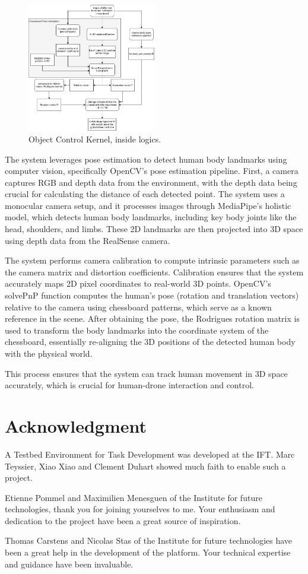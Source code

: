 \begin{figure}[htbp]
    \centerline{\includegraphics[width=0.5\textwidth]{images/objectcomplete.png}}
    \caption{Object Control Kernel, inside logics.}
    \label{fig}
    \end{figure} 
    The system leverages pose estimation to detect human body landmarks using computer vision, specifically OpenCV's pose estimation pipeline. First, a camera captures RGB and depth data from the environment, with the depth data being crucial for calculating the distance of each detected point. The system uses a monocular camera setup, and it processes images through MediaPipe's holistic model, which detects human body landmarks, including key body joints like the head, shoulders, and limbs. These 2D landmarks are then projected into 3D space using depth data from the RealSense camera.

    The system performs camera calibration to compute intrinsic parameters such as the camera matrix and distortion coefficients. Calibration ensures that the system accurately maps 2D pixel coordinates to real-world 3D points. OpenCV’s solvePnP function computes the human's pose (rotation and translation vectors) relative to the camera using chessboard patterns, which serve as a known reference in the scene. After obtaining the pose, the Rodrigues rotation matrix is used to transform the body landmarks into the coordinate system of the chessboard, essentially re-aligning the 3D positions of the detected human body with the physical world.
    
    This process ensures that the system can track human movement in 3D space accurately, which is crucial for human-drone interaction and control.

\pagebreak

\section*{Acknowledgment}
A Testbed Environment for Task Development was developed at
the IFT. Marc Teyssier, Xiao Xiao and Clement Duhart showed
much faith to enable such a project.

Etienne Pommel and Maximilien Menesguen of the Institute for future technologies, thank you
for joining yourselves to me. Your enthusiasm and dedication to the project have been a great source of inspiration.

Thomas Carstens and Nicolas Stas of the Institute for future technologies have been a great help in the development of the platform. Your technical expertise and guidance have been invaluable.
